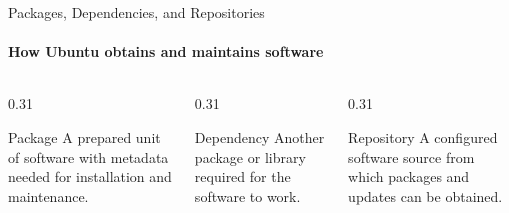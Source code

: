 \begin{frame}{Packages, Dependencies, and Repositories}
\framesubtitle{How Ubuntu obtains and maintains software}

\begin{columns}[T,onlytextwidth]
    \begin{column}{0.31\textwidth}
        \begin{block}{Package}
            A prepared unit of software with metadata needed for installation
            and maintenance.
        \end{block}
    \end{column}
    \hfill
    \begin{column}{0.31\textwidth}
        \begin{block}{Dependency}
            Another package or library required for the software to work.
        \end{block}
    \end{column}
    \hfill
    \begin{column}{0.31\textwidth}
        \begin{block}{Repository}
            A configured software source from which packages and updates
            can be obtained.
        \end{block}
    \end{column}
\end{columns}

\end{frame}





